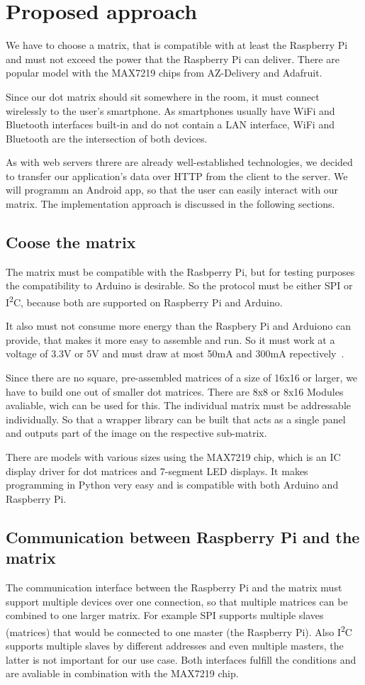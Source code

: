 \documentclass[conference]{IEEEtran}
\begin{document}
\section{Proposed approach}
We have to choose a matrix, that is compatible with at least the Raspberry Pi and must not exceed the power that the Raspberry Pi can deliver. There are popular model with the MAX7219 chips from AZ-Delivery and Adafruit.

Since our dot matrix should sit somewhere in the room, it must connect wirelessly to the user's smartphone. As smartphones usually have WiFi and Bluetooth interfaces built-in and do not contain a LAN interface, WiFi and Bluetooth are the intersection of both devices.

As with web servers threre are already well-established technologies, we decided to transfer our application's data over HTTP from the client to the server. We will programm an Android app, so that the user can easily interact with our matrix. The implementation approach is discussed in the following sections.


\subsection{Coose the matrix}
The matrix must be compatible with the Rasbperry Pi, but for testing purposes the compatibility to Arduino is desirable. So the protocol must be either SPI or I\textsuperscript{2}C, because both are supported on Raspberry Pi and Arduino.

It also must not consume more energy than the Raspbery Pi and Arduiono can provide, that makes it more easy to assemble and run. So it must work at a voltage of 3.3V or 5V and must draw at most 50mA and 300mA repectively~\cite{rpiperipherals}.

Since there are no square, pre-assembled matrices of a size of 16x16 or larger, we have to build one out of smaller dot matrices. There are 8x8 or 8x16 Modules avaliable, wich can be used for this. The individual matrix must be addressable individually. So that a wrapper library can be built that acts as a single panel and outputs part of the image on the respective sub-matrix.

There are models with various sizes using the MAX7219 chip, which is an IC display driver for dot matrices and 7-segment LED displays. It makes programming in Python very easy and is compatible with both Arduino and Raspberry Pi.

\subsection{Communication between Raspberry Pi and the matrix}
The communication interface between the Raspberry Pi and the matrix must support multiple devices over one connection, so that multiple matrices can be combined to one larger matrix. For example SPI supports multiple slaves (matrices) that would be connected to one master (the Raspberry Pi). Also I\textsuperscript{2}C supports multiple slaves by different addresses and even multiple masters, the latter is not important for our use case. Both interfaces fulfill the conditions and are avaliable in combination with the MAX7219 chip.
\end{document}

